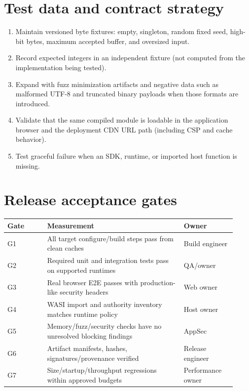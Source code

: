 \documentclass[11pt,letterpaper]{article}
\begin{document}
\section{Test data and contract strategy}
\begin{enumerate}
\item Maintain versioned byte fixtures: empty, singleton, random fixed seed, high-bit bytes, maximum accepted buffer, and oversized input.
\item Record expected integers in an independent fixture (not computed from the implementation being tested).
\item Expand with fuzz minimization artifacts and negative data such as malformed UTF-8 and truncated binary payloads when those formats are introduced.
\item Validate that the same compiled module is loadable in the application browser and the deployment CDN URL path (including CSP and cache behavior).
\item Test graceful failure when an SDK, runtime, or imported host function is missing.
\end{enumerate}

\section{Release acceptance gates}
\begin{longtable}{p{0.16\linewidth}p{0.55\linewidth}p{0.21\linewidth}}
\toprule Gate & Measurement & Owner \\ \midrule \endhead
G1 & All target configure/build steps pass from clean caches & Build engineer \\
G2 & Required unit and integration tests pass on supported runtimes & QA/owner \\
G3 & Real browser E2E passes with production-like security headers & Web owner \\
G4 & WASI import and authority inventory matches runtime policy & Host owner \\
G5 & Memory/fuzz/security checks have no unresolved blocking findings & AppSec \\
G6 & Artifact manifests, hashes, signatures/provenance verified & Release engineer \\
G7 & Size/startup/throughput regressions within approved budgets & Performance owner \\
\bottomrule
\end{longtable}
\end{document}

